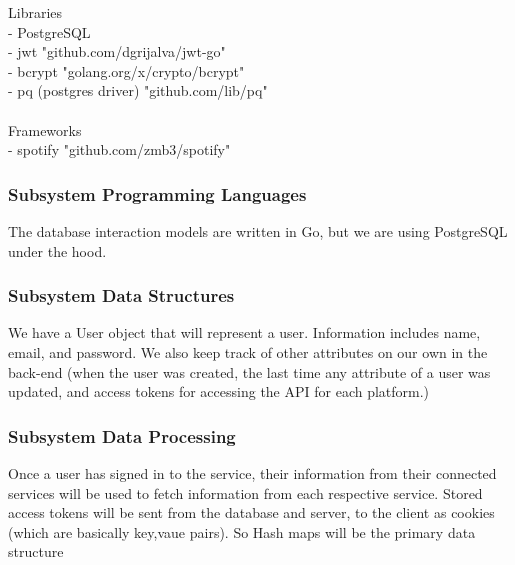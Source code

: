 Libraries \\
- PostgreSQL \\
- jwt \hspace{3.2cm} "github.com/dgrijalva/jwt-go" \\
- bcrypt \hspace{2.7cm} "golang.org/x/crypto/bcrypt" \\
- pq (postgres driver) \hspace{0.45cm} "github.com/lib/pq" \\ \\
Frameworks \\
- spotify \hspace{2.6cm} "github.com/zmb3/spotify" \\

\subsubsection{Subsystem Programming Languages}
The database interaction models are written in Go, but we are using PostgreSQL under the hood. \\

\subsubsection{Subsystem Data Structures}
We have a User object that will represent a user. Information includes name, email, and password. We also keep track of other attributes on our own in the back-end (when the user was created, the last time any attribute of a user was updated, and access tokens for accessing the API for each platform.) \\

\subsubsection{Subsystem Data Processing}
Once a user has signed in to the service, their information from their connected services will be used to fetch information from each respective service. Stored access tokens will be sent from the database and server, to the client as cookies (which are basically key,vaue pairs). So Hash maps will be the primary data structure

\newpage